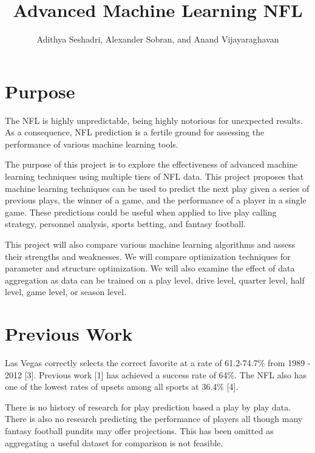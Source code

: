 \documentclass[english]{article}
\begin{document}
\title{Advanced Machine Learning NFL}


\author{Adithya Seshadri, Alexander Sobran, and Anand Vijayaraghavan}

\maketitle

\section*{Purpose}

	The NFL is highly unpredictable, being highly notorious for unexpected results. As a consequence, NFL prediction is a fertile ground for assessing the performance of various machine learning tools. 

The purpose of this project is to explore the effectiveness of advanced machine learning techniques using multiple tiers of NFL data. This project proposes that machine learning techniques can be used to predict the next play given a series of previous plays, the winner of a game, and the performance of a player in a single game. These predictions could be useful when applied to live play calling strategy, personnel analysis, sports betting, and fantasy football.

This project will also compare various machine learning algorithms and assess their strengths and weaknesses. We will compare optimization techniques for parameter and structure optimization. We will also examine the effect of data aggregation as data can be trained on a play level, drive level, quarter level, half level, game level, or season level.

\section*{Previous Work}

Las Vegas correctly selects the correct favorite at a rate of 61.2-74.7\% from 1989 - 2012 [3]. Previous work [1] has achieved a success rate of 64\%. The NFL also has one of the lowest rates of upsets among all sports at 36.4\% [4].

There is no history of research for play prediction based a play by play data. There is also no research predicting the performance of players all though many fantasy football pundits may offer projections. This has been omitted as aggregating a useful dataset for comparison is not feasible.
\end{document}
